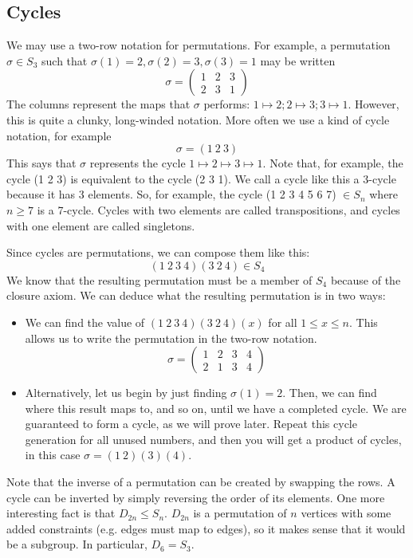 \subsection{Cycles}
We may use a two-row notation for permutations.
For example, a permutation \(\sigma \in S_3\) such that \(\sigma(1) = 2, \sigma(2) = 3, \sigma(3) = 1\) may be written
\[
	\sigma = \begin{pmatrix}
		1 & 2 & 3 \\
		2 & 3 & 1
	\end{pmatrix}
\]
The columns represent the maps that \(\sigma\) performs: \(1 \mapsto 2; 2 \mapsto 3; 3 \mapsto 1\).
However, this is quite a clunky, long-winded notation.
More often we use a kind of cycle notation, for example
\[
	\sigma = (1\ 2\ 3)
\]
This says that \(\sigma\) represents the cycle \(1 \mapsto 2 \mapsto 3 \mapsto 1\).
Note that, for example, the cycle (1 2 3) is equivalent to the cycle (2 3 1).
We call a cycle like this a 3-cycle because it has 3 elements.
So, for example, the cycle (1 2 3 4 5 6 7) \(\in S_n\) where \(n \geq 7\) is a 7-cycle.
Cycles with two elements are called transpositions, and cycles with one element are called singletons.

Since cycles are permutations, we can compose them like this:
\[
	(1\ 2\ 3\ 4)(3\ 2\ 4) \in S_4
\]
We know that the resulting permutation must be a member of \(S_4\) because of the closure axiom.
We can deduce what the resulting permutation is in two ways:
\begin{itemize}
	\item We can find the value of \((1\ 2\ 3\ 4)(3\ 2\ 4)(x)\) for all \(1 \leq x \leq n\).
	      This allows us to write the permutation in the two-row notation.
	      \[
		      \sigma = \begin{pmatrix}
			      1 & 2 & 3 & 4 \\
			      2 & 1 & 3 & 4
		      \end{pmatrix}
	      \]
	\item Alternatively, let us begin by just finding \(\sigma(1) = 2\).
	      Then, we can find where this result maps to, and so on, until we have a completed cycle.
	      We are guaranteed to form a cycle, as we will prove later.
	      Repeat this cycle generation for all unused numbers, and then you will get a product of cycles, in this case \(\sigma = (1\ 2)(3)(4)\).
\end{itemize}
Note that the inverse of a permutation can be created by swapping the rows.
A cycle can be inverted by simply reversing the order of its elements.
One more interesting fact is that \(D_{2n} \leq S_n\).
\(D_{2n}\) is a permutation of \(n\) vertices with some added constraints (e.g.
edges must map to edges), so it makes sense that it would be a subgroup.
In particular, \(D_6 = S_3\).

